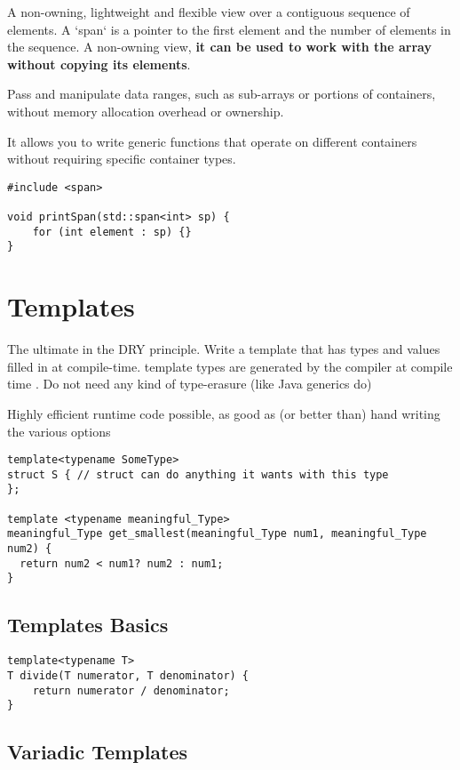 A non-owning, lightweight and flexible view over a contiguous sequence of elements.
A `span` is a pointer to the first element and the number of elements in the sequence.
A non-owning view, \textbf{it can be used to work with the array without copying its elements}.

Pass and manipulate data ranges, such as sub-arrays or portions of containers,
without memory allocation overhead or ownership.

It allows you to write generic functions that operate on different containers
without requiring specific container types.

\begin{verbatim}
#include <span>

void printSpan(std::span<int> sp) {
    for (int element : sp) {}
}
\end{verbatim}

\section{Templates}

The ultimate in the DRY principle. Write a template that has types and values filled in at compile-time.
template types are generated by the compiler at compile time
. Do not need any kind of type-erasure (like Java generics do)

Highly efficient runtime code possible, 
as good as (or better than) hand writing the various options

\begin{verbatim}
template<typename SomeType>
struct S { // struct can do anything it wants with this type
};

template <typename meaningful_Type>
meaningful_Type get_smallest(meaningful_Type num1, meaningful_Type num2) {
  return num2 < num1? num2 : num1;
}
\end{verbatim}

\subsection{Templates Basics}

\begin{verbatim}
template<typename T>
T divide(T numerator, T denominator) {
    return numerator / denominator;
}
\end{verbatim}

\subsection{Variadic Templates}

